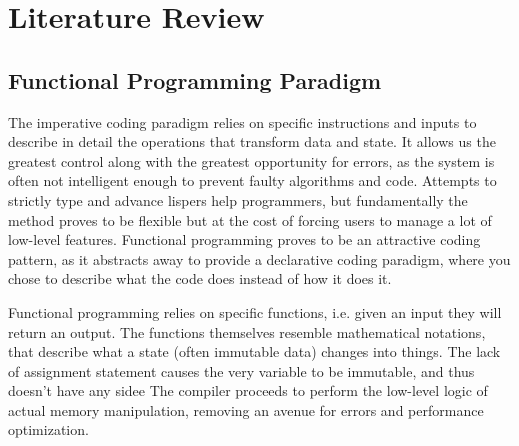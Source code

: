 
\section{Literature Review}






\subsection{Functional Programming Paradigm}

The imperative coding paradigm relies on specific instructions and inputs to describe in detail the operations that transform data and state. It allows us the greatest control along with the greatest opportunity for errors, as the system is often not intelligent enough to prevent faulty algorithms and code. Attempts to strictly type and advance lispers help programmers, but fundamentally the method proves to be flexible but at the cost of forcing users to manage a lot of low-level features. Functional programming proves to be an attractive coding pattern, as it abstracts away to provide a declarative coding paradigm, where you chose to describe what the code does instead of how it does it. 



Functional programming relies on specific functions, i.e. given an input they will return an output. The functions themselves resemble mathematical notations, that describe what a state (often immutable data) changes into things. The lack of assignment statement causes the very variable to be immutable, and thus doesn't have any sidee The compiler proceeds to perform the low-level logic of actual memory manipulation, removing an avenue for errors and performance optimization.

